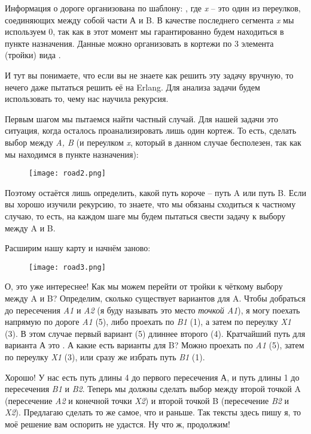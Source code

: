 Информация о дороге организована по шаблону: , где \emph{x} \--- это один из переулков, соединяющих между собой части А и B.
В качестве последнего сегмента \emph{x} мы используем 0, так как в этот момент мы гарантированно будем находиться в пункте назначения.
Данные можно организовать в кортежи по 3 элемента (тройки) вида .

И тут вы понимаете, что если вы не знаете как решить эту задачу вручную, то нечего даже пытаться решить её на Erlang.
Для анализа задачи будем использовать то, чему нас научила рекурсия.

Первым шагом мы пытаемся найти частный случай.
Для нашей задачи это ситуация, когда осталось проанализировать лишь один кортеж.
То есть, сделать выбор между \emph{A, B} (и переулком \emph{x}, который в данном случае бесполезен, так как мы находимся в пункте назначения):
\begin{figure}[h!]
    \texttt{[image: road2.png]}
\end{figure}

Поэтому остаётся лишь определить, какой путь короче \--- путь A или путь B.
Если вы хорошо изучили рекурсию, то знаете, что мы обязаны сходиться к частному случаю, то есть, на каждом шаге мы будем пытаться свести задачу к выбору между A и B.

Расширим нашу карту и начнём заново:
\begin{figure}[h!]
    \texttt{[image: road3.png]}
\end{figure}

О, это уже интереснее!
Как мы можем перейти от тройки  к чёткому выбору между A и B?
Определим, сколько существует вариантов для A.
Чтобы добраться до пересечения \emph{A1} и \emph{A2} (я буду называть это место \emph{точкой A1}), я могу поехать напрямую по дороге \emph{A1} (5), либо проехать по \emph{B1} (1), а затем по переулку \emph{X1} (3).
В этом случае первый вариант (5) длиннее второго (4).
Кратчайший путь для варианта А это \ops{[B, X]}.
А какие есть варианты для B?
Можно проехать по \emph{A1} (5), затем по переулку \emph{X1} (3), или сразу же избрать путь \emph{B1} (1).

Хорошо!
У нас есть путь длины 4 \ops{[B, X]} до первого пересечения А, и путь длины 1 \ops{[B]} до пересечения \emph{B1} и \emph{B2}.
Теперь мы должны сделать выбор между второй точкой A (пересечение \emph{A2} и конечной точки \emph{X2}) и второй точкой B (пересечение \emph{B2} и \emph{X2}).
Предлагаю сделать то же самое, что и раньше.
Так тексты здесь пишу я, то моё решение вам оспорить не удастся.
Ну что ж, продолжим!

